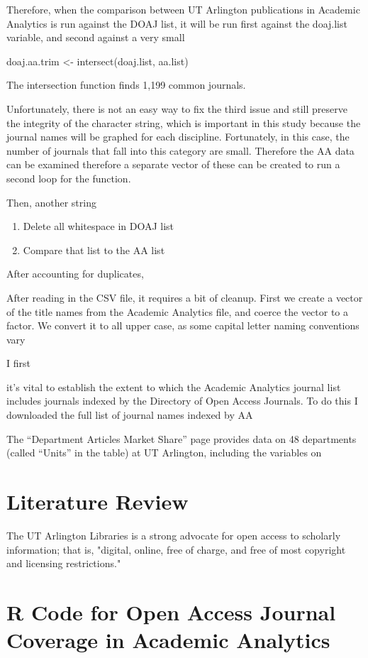 \documentclass{article}
\begin{document}
Therefore, when the comparison between UT Arlington publications in Academic Analytics is run against the DOAJ list, it will be run first against the doaj.list variable, and second against a very small 


	doaj.aa.trim <- intersect(doaj.list, aa.list) 




The intersection function finds 1,199 common journals.

Unfortunately, there is not an easy way to fix the third issue and still preserve the integrity of the character string, which is important in this study because the journal names will be graphed for each discipline.
Fortunately, in this case, the number of journals that fall into this category are small.
Therefore the AA data can be examined  therefore a separate vector of these can be created to run a second loop for the function.

Then, another string 
\begin{enumerate}
	\item Delete all whitespace in DOAJ list
	\item Compare that list to the AA list
\end{enumerate}	


After accounting for duplicates, 


After reading in the CSV file, it requires a bit of cleanup. First we create a vector of the title names from the Academic Analytics file, and coerce the vector to a factor. We convert it to all upper case, as some capital letter naming conventions vary 



I first 



it's vital to establish the extent to which the Academic Analytics journal list includes journals indexed by the Directory of Open Access Journals. To do this I downloaded the full list of journal names indexed by AA





The “Department Articles Market Share” page provides data on 48 departments (called “Units” in the table) at UT Arlington, including the variables on 





\section{Literature Review}
The UT Arlington Libraries is a strong advocate for open access to scholarly information; that is, "digital, online, free of charge, and free of most copyright and licensing restrictions."  \cite{RefWorks:102}













\appendix
\section{R Code for Open Access Journal Coverage in Academic Analytics}
\end{document}
